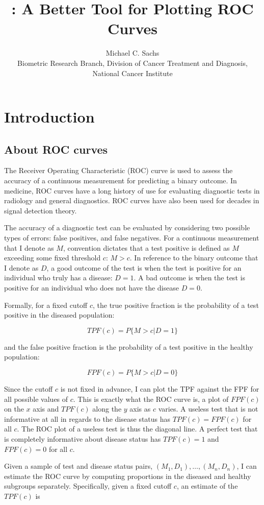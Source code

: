 \documentclass[codesnippet]{jss}
\author{		Michael C. Sachs\\Biometric Research Branch, Division of Cancer Treatment and Diagnosis,
National Cancer Institute		}
\title{\pkg{plotROC}: A Better Tool for Plotting ROC Curves}
\begin{document}
\section{Introduction}\label{introduction}

\subsection{About ROC curves}\label{about-roc-curves}

The Receiver Operating Characteristic (ROC) curve is used to assess the
accuracy of a continuous measurement for predicting a binary outcome. In
medicine, ROC curves have a long history of use for evaluating
diagnostic tests in radiology and general diagnostics. ROC curves have
also been used for decades in signal detection theory.

The accuracy of a diagnostic test can be evaluated by considering two
possible types of errors: false positives, and false negatives. For a
continuous measurement that I denote as \(M\), convention dictates that
a test positive is defined as \(M\) exceeding some fixed threshold
\(c\): \(M > c\). In reference to the binary outcome that I denote as
\(D\), a good outcome of the test is when the test is positive for an
individual who truly has a disease: \(D = 1\). A bad outcome is when the
test is positive for an individual who does not have the disease
\(D = 0\).

Formally, for a fixed cutoff \(c\), the true positive fraction is the
probability of a test positive in the diseased population:

\[ TPF(c) = P\{ M > c | D = 1 \} \]

and the false positive fraction is the probability of a test positive in
the healthy population:

\[ FPF(c) = P\{ M > c | D = 0 \} \]

Since the cutoff \(c\) is not fixed in advance, I can plot the TPF
against the FPF for all possible values of \(c\). This is exactly what
the ROC curve is, a plot of \(FPF(c)\) on the \(x\) axis and \(TPF(c)\)
along the \(y\) axis as \(c\) varies. A useless test that is not
informative at all in regards to the disease status has
\(TPF(c) = FPF(c)\) for all \(c\). The ROC plot of a useless test is
thus the diagonal line. A perfect test that is completely informative
about disease status has \(TPF(c) = 1\) and \(FPF(c) = 0\) for all
\(c\).

Given a sample of test and disease status pairs,
\((M_1, D_1), \ldots, (M_n, D_n)\), I can estimate the ROC curve by
computing proportions in the diseased and healthy subgroups separately.
Specifically, given a fixed cutoff \(c\), an estimate of the \(TPF(c)\)
is
\end{document}
